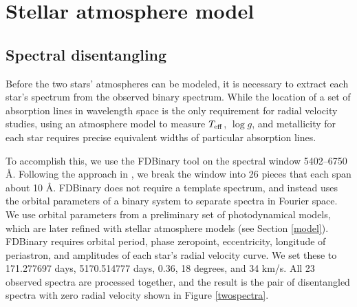 \section{Stellar atmosphere model}\label{atm}

\subsection{Spectral disentangling}\label{disentangle}
Before the two stars' atmospheres can be modeled, it is necessary to extract each star's spectrum from the observed binary spectrum. While the location of a set of absorption lines in wavelength space is the only requirement for radial velocity studies, using an atmosphere model to measure $T_{\rm{eff}}$, $\log g$, and metallicity for each star requires precise equivalent widths of particular absorption lines.

To accomplish this, we use the FDBinary tool \citep{iji04} on the spectral window 5402--6750 \AA. Following the approach in \citet{bec14}, we break the window into 26 pieces that each span about 10 \AA. FDBinary does not require a template spectrum, and instead uses the orbital parameters of a binary system to separate spectra in Fourier space. We use orbital parameters from a preliminary set of photodynamical models, which are later refined with stellar atmosphere models (see Section \ref{model}). FDBinary requires orbital period, phase zeropoint, eccentricity, longitude of periastron, and amplitudes of each star's radial velocity curve. We set these to 171.277697 days, 5170.514777 days, 0.36, 18 degrees, and 34 km/s. All 23 observed spectra are processed together, and the result is the pair of disentangled spectra with zero radial velocity shown in Figure \ref{twospectra}.
